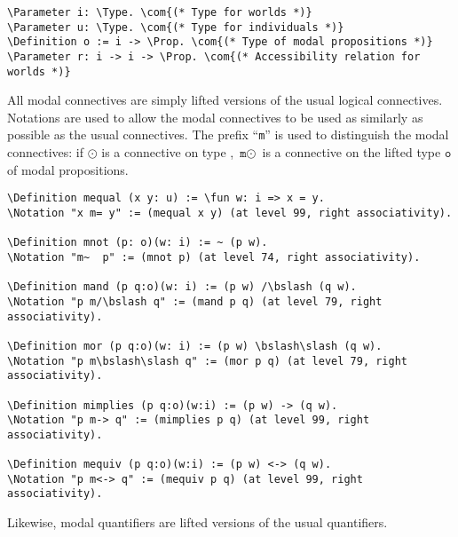 \documentclass{llncs}
\newcommand{\red}[1]{\textcolor[rgb]{1,0,0}{#1}}
\newcommand{\blue}[1]{\textcolor[rgb]{0,0,1}{#1}}
\newcommand{\brown}[1]{\textcolor[rgb]{0.8,0.6,0.4}{#1}}
\newcommand{\Parameter}{\red{Parameter}}
\newcommand{\Definition}{\red{Definition}}
\newcommand{\Notation}{\blue{Notation}}
\newcommand{\Prop}{\blue{Prop}}
\newcommand{\Type}{\blue{Type}}
\newcommand{\fun}{\blue{fun}}
\newcommand{\com}[1]{\brown{#1}}
\newcommand{\bslash}{\symbol{92}}
\begin{document}
\newcommand{\verbsize}{\small}

\begin{small}
\begin{Verbatim}[commandchars=\\\{\},fontsize=\verbsize]
\Parameter i: \Type. \com{(* Type for worlds *)}
\Parameter u: \Type. \com{(* Type for individuals *)}
\Definition o := i -> \Prop. \com{(* Type of modal propositions *)}
\Parameter r: i -> i -> \Prop. \com{(* Accessibility relation for worlds *)}
\end{Verbatim}
\end{small}

\noindent
All modal connectives are simply lifted versions of the usual logical connectives. Notations are used to allow the modal connectives to be used as similarly as possible as the usual connectives. The prefix ``\texttt{m}'' is used to distinguish the modal connectives: if $\odot$ is a connective on type , $\texttt{m}\odot$ is a connective on the lifted type $\texttt{o}$ of modal propositions.  

\begin{Verbatim}[commandchars=\\\{\},fontsize=\verbsize]
\Definition mequal (x y: u) := \fun w: i => x = y.
\Notation "x m= y" := (mequal x y) (at level 99, right associativity).

\Definition mnot (p: o)(w: i) := ~ (p w).
\Notation "m~  p" := (mnot p) (at level 74, right associativity).

\Definition mand (p q:o)(w: i) := (p w) /\bslash (q w).
\Notation "p m/\bslash q" := (mand p q) (at level 79, right associativity).

\Definition mor (p q:o)(w: i) := (p w) \bslash\slash (q w).
\Notation "p m\bslash\slash q" := (mor p q) (at level 79, right associativity).

\Definition mimplies (p q:o)(w:i) := (p w) -> (q w).
\Notation "p m-> q" := (mimplies p q) (at level 99, right associativity).

\Definition mequiv (p q:o)(w:i) := (p w) <-> (q w).
\Notation "p m<-> q" := (mequiv p q) (at level 99, right associativity).
\end{Verbatim}

\noindent
Likewise, modal quantifiers are lifted versions of the usual quantifiers.
\end{document}
